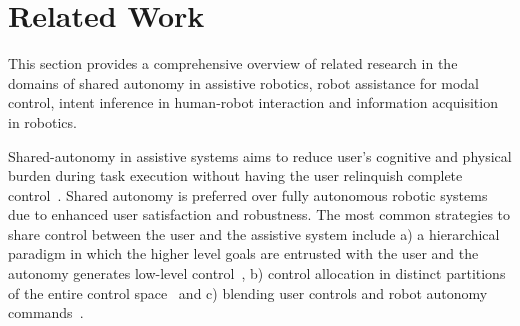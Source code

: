 %


\section{Related Work}\label{sec:related-work}
This section provides a comprehensive overview of related research in the domains of shared autonomy in assistive robotics, robot assistance for modal control, intent inference in human-robot interaction and information acquisition in robotics. 

Shared-autonomy in assistive systems aims to reduce user's cognitive and physical burden during task execution without having the user relinquish complete control~\cite{philips2007adaptive,demeester2008user, gopinath2017human, muelling2017autonomy}. Shared autonomy is preferred over fully autonomous robotic systems due to enhanced user satisfaction and robustness. The most common strategies to share control between the user and the assistive system include a) a hierarchical paradigm in which the higher level goals are entrusted with the user and the autonomy generates low-level control~\cite{tsui2011want, kim2010relationship, kim2012autonomy}, b) control allocation in distinct partitions of the entire control space~\cite{driessen2005collaborative} and c) blending user controls and robot autonomy commands~\cite{downey2016blending, storms2014blending, muelling2017autonomy}. 

